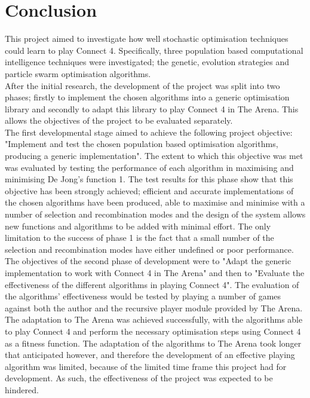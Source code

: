 \chapter{Conclusion}

This project aimed to investigate how well stochastic optimisation techniques could learn to play Connect 4. Specifically, three population based computational intelligence techniques were investigated; the genetic, evolution strategies and particle swarm optimisation algorithms.
\\After the initial research, the development of the project was split into two phases; firstly to implement the chosen algorithms into a generic optimisation library and secondly to adapt this library to play Connect 4 in The Arena. This allows the objectives of the project to be evaluated separately.
\\The first developmental stage aimed to achieve the following project objective: "Implement and test the chosen population based optimisation algorithms, producing a generic implementation". The extent to which this objective was met was evaluated by testing the performance of each algorithm in maximising and minimising De Jong's function 1. The test results for this phase show that this objective has been strongly achieved; efficient and accurate implementations of the chosen algorithms have been produced, able to maximise and minimise with a number of selection and recombination modes and the design of the system allows new functions and algorithms to be added with minimal effort. The only limitation to the success of phase 1 is the fact that a small number of the selection and recombination modes have either undefined or poor performance. 
\\The objectives of the second phase of development were to "Adapt the generic implementation to work with Connect 4 in The Arena" and then to "Evaluate the effectiveness of the different algorithms in playing Connect 4". The evaluation of the algorithms' effectiveness would be tested by playing a number of games against both the author and the recursive player module provided by The Arena. The adaptation to The Arena was achieved successfully, with the algorithms able to play Connect 4 and perform the necessary optimisation steps using Connect 4 as a fitness function. The adaptation of the algorithms to The Arena took longer that anticipated however, and therefore the development of an effective playing algorithm was limited, because of the limited time frame this project had for development. As such, the effectiveness of the project was expected to be hindered. 
